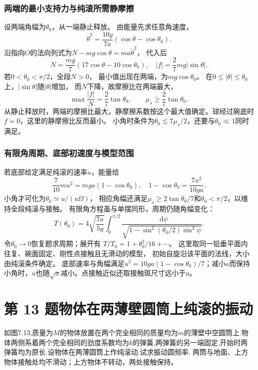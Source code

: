 \documentclass[UTF8,fontset=fandol,a4paper,11pt]{ctexart}
\newcommand{\dd}{\mathop{}\!\mathrm{d}}
\newcommand{\tagline}[1]{\noindent{\small\color{muted}#1}\par}
\begin{document}
\subsubsection*{两端的最小支持力与纯滚所需静摩擦}
设两端角幅为$\theta_0$，从一端静止释放。
由能量先求任意角速度，
\[
\dot\theta^2=\frac{10g}{7a}(\cos\theta-\cos\theta_0).
\]
沿指向$O$的法向列式为$N-mg\cos\theta=ma\dot\theta^2$，
代入后
\[
N=\frac{mg}{7}(17\cos\theta-10\cos\theta_0),
\quad |f|=\frac27mg|\sin\theta|.
\]
若$0<\theta_0<\pi/2$，全段$N>0$，
最小值出现在两端，为$mg\cos\theta_0$。
在$0\le|\theta|\le\theta_0$上，$|\sin\theta|$随$|\theta|$增加，
而$N$下降，故摩擦比在两端最大，
\[
\max\frac{|f|}{N}=\frac27\tan\theta_0,
\qquad\boxed{\mu_s\ge\frac27\tan\theta_0}.
\]
从静止释放时，两端的摩擦比最大，静摩擦系数按这个最大值确定。球经过碗底时$f=0$，这里的静摩擦比反而最小。
小角时条件为$\theta_0\lesssim7\mu_s/2$，还要与$\theta_0\ll1$同时满足。

\subsubsection*{有限角周期、底部初速度与模型范围}
若底部给定满足纯滚的速率$u$，能量给
\[
\frac7{10}mu^2=mga(1-\cos\theta_0),
\quad 1-\cos\theta_0=\frac{7u^2}{10ga}.
\]
小角才可化为$\theta_0\simeq u/(a\Omega)$，
相应角幅还满足$\mu_s\ge2\tan\theta_0/7$和$\theta_0<\pi/2$，以维持全段纯滚与接触。
有限角方程虽与单摆同形，周期仍随角幅变化：
\[
T(\theta_0)=4\sqrt{\frac{7a}{5g}}
\int_0^{\pi/2}\frac{\dd\psi}{\sqrt{1-\sin^2(\theta_0/2)\sin^2\psi}}.
\]
令$\theta_0\to0$恢复题求周期；展开有
$T/T_0=1+\theta_0^2/16+\cdots$。
这里取同一铅垂平面内往复、碗面固定、刚性点接触且无滑动的模型，
初始自旋沿该平面的法线，大小由纯滚条件确定。
底部速率与角幅满足$u^2=10ga(1-\cos\theta_0)/7$；减小$a$而保持小角时，$u$也随$\sqrt a$减小。点接触近似还取接触斑尺寸远小于$a$。




\section*{第 13 题\quad 物体在两薄壁圆筒上纯滚的振动}

\tagline{M-07-13}

如图7.13,质量为\(M\)的物体放置在两个完全相同的质量均为\(m\)的薄壁中空圆筒上.物体两侧系着两个完全相同的劲度系数均为\(k\)的弹簧,两弹簧的另一端固定,开始时两弹簧均为原长.设物体在两薄圆筒上作纯滚动.试求振动圆频率.
两筒与地面、上方物体接触处均不滑动；上方物体不转动，两处接触保持。
\end{document}
